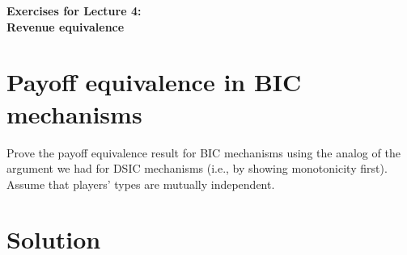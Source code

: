 \documentclass[a4paper]{article}
\newif\ifsolutions
\begin{document}
\begin{center}
		\LARGE\textbf{Exercises for Lecture 4:\\ Revenue equivalence}
\end{center}


\section{Payoff equivalence in BIC mechanisms}

	Prove the payoff equivalence result for BIC mechanisms using the analog of the argument we had for DSIC mechanisms (i.e., by showing monotonicity first). Assume that players' types are mutually independent.
	
\ifsolutions
\section*{Solution}
\end{document}
